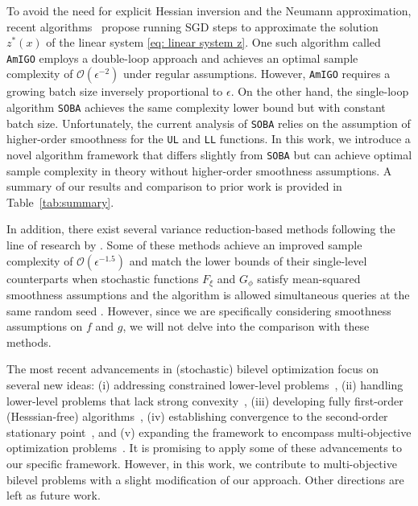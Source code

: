 \documentclass[10pt]{article}
\theoremstyle{remark}
\newcommand{\cO}{\mathcal{O}}
\begin{document}
To avoid the need for explicit Hessian inversion and the Neumann approximation, recent algorithms~\cite{arbel2022amortized, dagreou2022framework} propose running SGD steps to approximate the solution $z^*(x)$ of the linear system \eqref{eq: linear system z}. One such algorithm called \texttt{AmIGO} \cite{arbel2022amortized} employs a double-loop approach and achieves an optimal sample complexity of $\cO(\epsilon^{-2})$ under regular assumptions. However, \texttt{AmIGO} requires a growing batch size inversely proportional to $\epsilon$. On the other hand, the single-loop algorithm \texttt{SOBA} \cite{dagreou2022framework} achieves the same complexity lower bound but with constant batch size. Unfortunately, the current analysis of \texttt{SOBA} relies on the assumption of higher-order smoothness for the \texttt{UL} and \texttt{LL} functions. In this work, we introduce a novel algorithm framework that differs slightly from \texttt{SOBA} but can achieve optimal sample complexity in theory without higher-order smoothness assumptions. A summary of our results and comparison to prior work is provided in Table~\ref{tab:summary}.

In addition, there exist several variance reduction-based methods following the line of research by \cite{yang2021provably, khanduri2021near, yang2021provably, dagreou2023lower, guo2021randomized, li2022fully}. Some of these methods achieve an improved sample complexity of $\mathcal{O}(\epsilon^{-1.5})$ and match the lower bounds of their single-level counterparts when stochastic functions $F_\xi$ and $G_\phi$ satisfy mean-squared smoothness assumptions and the algorithm is allowed simultaneous queries at the same random seed \cite{arjevani2023lower}. However, since we are specifically considering smoothness assumptions on $f$ and $g$, we will not delve into the comparison with these methods.

The most recent advancements in (stochastic) bilevel optimization focus on several new ideas: (i) addressing constrained lower-level problems~\cite{shen2023penalty, xiao2023alternating, tsaknakis2022implicit, giovannelli2021inexact}, (ii) handling lower-level problems that lack strong convexity~\cite{chen2023bilevel, huang2023momentum, liu2023averaged, liu2021towards, sow2022constrained, jiang2023conditional}, (iii) developing fully first-order (Hesssian-free) algorithms~\cite{liu2022bome, kwon2023fully, sow2022convergence}, (iv) establishing convergence to the second-order stationary point~\cite{huang2022efficiently}, and (v) expanding the framework to encompass multi-objective optimization problems~\cite{giovannelli2023bilevel, gu2022min, hu2022multi}. It is promising to apply some of these advancements to our specific framework. However, in this work, we contribute to multi-objective bilevel problems with a slight modification of our approach. Other directions are left as future work.
\end{document}
